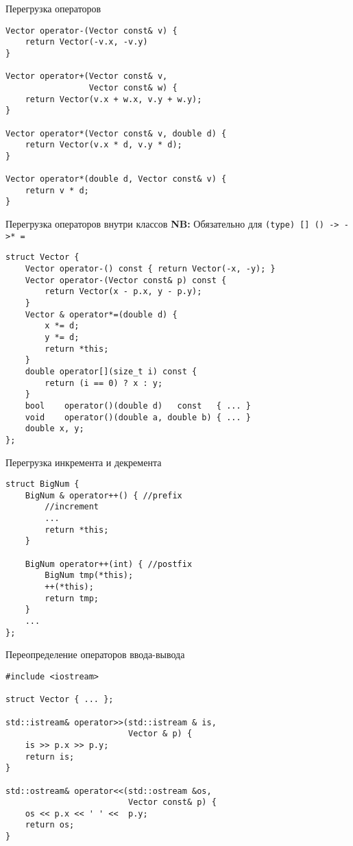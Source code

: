 \documentclass{beamer}
\begin{document}
\begin{frame}[fragile]{Перегрузка операторов}
    \begin{lstlisting}
Vector operator-(Vector const& v) {
    return Vector(-v.x, -v.y)
}

Vector operator+(Vector const& v, 
                 Vector const& w) {
    return Vector(v.x + w.x, v.y + w.y);
}

Vector operator*(Vector const& v, double d) {
    return Vector(v.x * d, v.y * d);
}

Vector operator*(double d, Vector const& v) {
    return v * d;
}
    \end{lstlisting}
\end{frame}

\begin{frame}[fragile]{Перегрузка операторов внутри классов}
    {}\small\textbf{NB:} Обязательно для {\color{blue}\verb!(type) [] () -> ->* =!}

    \begin{lstlisting}[basicstyle=\fontsize{9pt}{1em}\ttfamily]
struct Vector {
    Vector operator-() const { return Vector(-x, -y); }
    Vector operator-(Vector const& p) const {
        return Vector(x - p.x, y - p.y);
    }
    Vector & operator*=(double d) {
        x *= d;
        y *= d;
        return *this;
    }
    double operator[](size_t i) const { 
        return (i == 0) ? x : y;
    }
    bool    operator()(double d)   const   { ... }
    void    operator()(double a, double b) { ... }
    double x, y;
};
    \end{lstlisting}
\end{frame}

\begin{frame}[fragile]{Перегрузка инкремента и декремента}
    \begin{lstlisting}
struct BigNum {
    BigNum & operator++() { //prefix
        //increment
        ...
        return *this;
    }

    BigNum operator++(int) { //postfix
        BigNum tmp(*this);
        ++(*this);
        return tmp;
    }
    ...
};
    \end{lstlisting}
\end{frame}

\begin{frame}[fragile]{Переопределение операторов ввода-вывода}
    \begin{lstlisting}
#include <iostream>
        
struct Vector { ... };

std::istream& operator>>(std::istream & is, 
                         Vector & p) {
    is >> p.x >> p.y;
    return is;
}

std::ostream& operator<<(std::ostream &os, 
                         Vector const& p) {
    os << p.x << ' ' <<  p.y;
    return os;
}
    \end{lstlisting}
\end{frame}
\end{document}
